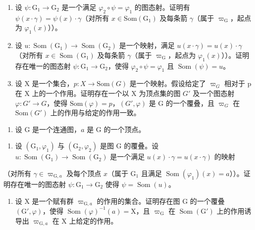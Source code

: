 \begin{enumerate}
\def\labelenumi{\alph{enumi})}
\item
  设 \(\psi\colon\mathrm{G}_{1}\to\mathrm{G}_{2}\) 是一个满足 \(\varphi_{2}\circ\psi=\varphi_{1}\) 的图态射。证明有 \(\psi(x\cdot\gamma)=\psi(x)\cdot\gamma\)（对所有 \(x\in\mathrm{Som}(\mathrm{G}_{1})\) 及每条箭 \(\gamma\)（属于 \(\varpi_{\mathrm{G}}\)，起点为 \(\varphi_{1}(x)\)））。
\item
  设 \(u \colon \operatorname{Som}(\mathrm{G}_1) \to \operatorname{Som}(\mathrm{G}_2)\) 是一个映射，满足 \(u(x \cdot \gamma) = u(x) \cdot \gamma\)（对所有 \(x \in \operatorname{Som}(\mathrm{G}_1)\) 及每条箭 \(\gamma\)（属于 \(\varpi_{\mathrm{G}}\)，起点为 \(\varphi_1(x)\)））。证明存在唯一的图态射 \(\psi \colon \mathrm{G}_1 \to \mathrm{G}_2\)，使得 \(\varphi_2 \circ \psi = \varphi_1\) 且 \(\operatorname{Som}(\psi) = u\)。
\item
  设 X 是一个集合，\(p: X \to \text{Som}(G)\) 是一个映射。假设给定了 \(\varpi_{G}\) 相对于 p 在 X 上的一个作用。证明存在一个以 X 为顶点集的图 \(G'\) 及一个图态射 \(\varphi: G' \to G\)，使得 \(\text{Som}(\varphi) = p\)，\((G', \varphi)\) 是 G 的一个覆叠，且 \(\varpi_{G}\) 在 \(\text{Som}(G')\) 上的作用与给定的作用一致。
\end{enumerate}

\begin{enumerate}
\def\labelenumi{\arabic{enumi})}
\setcounter{enumi}{7}
\tightlist
\item
  设 G 是一个连通图，\(a\) 是 G 的一个顶点。
\end{enumerate}

\begin{enumerate}
\def\labelenumi{\alph{enumi})}
\tightlist
\item
  设 \((\mathrm{G}_{1},\varphi_{1})\) 与 \((\mathrm{G}_{2},\varphi_{2})\) 是图 G 的覆叠。设 \(u\colon\operatorname{Som}(\mathrm{G}_{1})\to\operatorname{Som}(\mathrm{G}_{2})\) 是一个满足 \(u(x)\cdot\gamma=u(x\cdot\gamma)\) 的映射
\end{enumerate}

（对所有 \(\gamma \in \varpi_{\mathrm{G},a}\) 及每个顶点 \(x\)（属于 \(\mathrm{G}_1\) 且满足 \(\operatorname{Som}(\varphi_1)(x) = a\)））。证明存在唯一的图态射 \(\psi: \mathrm{G}_1 \to \mathrm{G}_2\) 使得 \(\psi = \operatorname{Som}(u)\)。

\begin{enumerate}
\def\labelenumi{\alph{enumi})}
\setcounter{enumi}{1}
\tightlist
\item
  设 X 是一个赋有群 \(\varpi_{\mathrm{G},a}\) 的作用的集合。证明存在图 G 的一个覆叠 \((\mathrm{G}',\varphi)\)，使得 \(\operatorname{Som}(\varphi)^{-1}(a) = \mathrm{X}\)，且 \(\varpi_{\mathrm{G}}\) 在 \(\operatorname{Som}(\mathrm{G}')\) 上的作用诱导出 \(\varpi_{\mathrm{G},a}\) 在 X 上给定的作用。
\end{enumerate}

